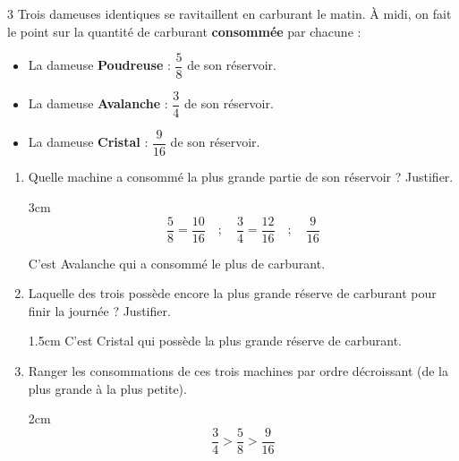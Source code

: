 \documentclass[a4paper]{book}
\begin{document}
{    \begin{exerciceNote}{3}
        Trois dameuses identiques se ravitaillent en carburant le matin. À midi, on fait le point sur la quantité de carburant \textbf{consommée} par chacune :
        \begin{itemize}
            \item La dameuse \textbf{Poudreuse} : $\dfrac{5}{8}$ de son réservoir.
            \item La dameuse \textbf{Avalanche} : $\dfrac{3}{4}$ de son réservoir.
            \item La dameuse \textbf{Cristal} : $\dfrac{9}{16}$ de son réservoir.
        \end{itemize}
        
        \begin{enumerate}[leftmargin=*]
            \item Quelle machine a consommé la plus grande partie de son réservoir ? Justifier.

            \begin{ZoneReponse}{3cm}
                \[\dfrac{5}{8}=\dfrac{10}{16} \quad ; \quad \dfrac{3}{4}=\dfrac{12}{16} \quad ; \quad \dfrac{9}{16}\]

                C'est Avalanche qui a consommé le plus de carburant.
            \end{ZoneReponse}
            
            \item Laquelle des trois possède encore la plus grande réserve de carburant pour finir la journée ? Justifier.

            \begin{ZoneReponse}{1.5cm}
                C'est Cristal qui possède la plus grande réserve de carburant.
            \end{ZoneReponse}

            \item Ranger les consommations de ces trois machines par ordre décroissant (de la plus grande à la plus petite).
            
            \begin{ZoneReponse}{2cm}
                \[\dfrac{3}{4}>\frac{5}{8}>\dfrac{9}{16}\]
            
            \end{ZoneReponse}
        \end{enumerate}
    \end{exerciceNote}


\newpage  


}
\end{document}
